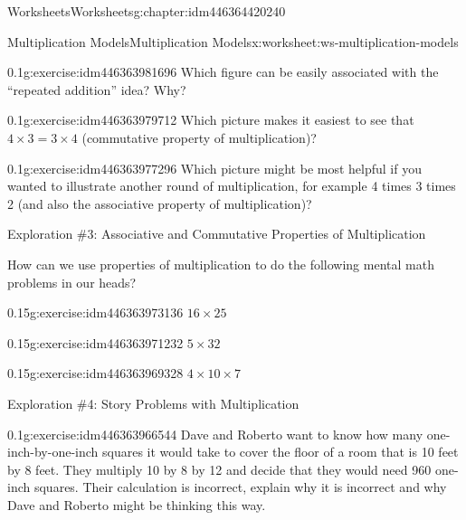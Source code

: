 \documentclass[twoside,11pt,]{book}
\begin{document}
\begin{chapterptx}{Worksheets}{}{Worksheets}{}{}{g:chapter:idm446364420240}
\begin{worksheet-section-numberless}{Multiplication Models}{}{Multiplication Models}{}{}{x:worksheet:ws-multiplication-models}
\begin{introduction}{}
\begin{description}
\end{description}
\end{introduction}%
\begin{divisionexercise}{5}{}{0.1}{g:exercise:idm446363981696}%
Which figure can be easily associated with the ``repeated addition'' idea? Why?%
\end{divisionexercise}%
\begin{divisionexercise}{6}{}{0.1}{g:exercise:idm446363979712}%
Which picture makes it easiest to see that \(4 \times 3 = 3 \times 4 \) (commutative property of multiplication)?%
\end{divisionexercise}%
\begin{divisionexercise}{7}{}{0.1}{g:exercise:idm446363977296}%
Which picture might be most helpful if you wanted to illustrate another round of multiplication, for example 4 times 3 times 2 (and also the associative property of multiplication)?%
\end{divisionexercise}%
\clearpage
\begin{introduction}{}%
Exploration \#3: Associative and Commutative Properties of Multiplication%
\par
How can we use properties of multiplication to do the following mental math problems in our heads?%
\end{introduction}%
\begin{divisionexercise}{8}{}{0.15}{g:exercise:idm446363973136}%
\(16 \times 25  \)%
\end{divisionexercise}%
\begin{divisionexercise}{9}{}{0.15}{g:exercise:idm446363971232}%
\(5 \times 32  \)%
\end{divisionexercise}%
\begin{divisionexercise}{10}{}{0.15}{g:exercise:idm446363969328}%
\(4 \times 10 \times 7  \)%
\end{divisionexercise}%
\begin{introduction}{}%
Exploration \#4: Story Problems with Multiplication\end{introduction}%
\begin{divisionexercise}{11}{}{0.1}{g:exercise:idm446363966544}%
Dave and Roberto want to know how many one-inch-by-one-inch squares it would take to cover the floor of a room that is 10 feet by 8 feet.  They multiply 10 by 8 by 12 and decide that they would need 960 one-inch squares.  Their calculation is incorrect, explain why it is incorrect and why Dave and Roberto might be thinking this way.%
\end{divisionexercise}%

\end{worksheet-section-numberless}
\end{chapterptx}
\end{document}
